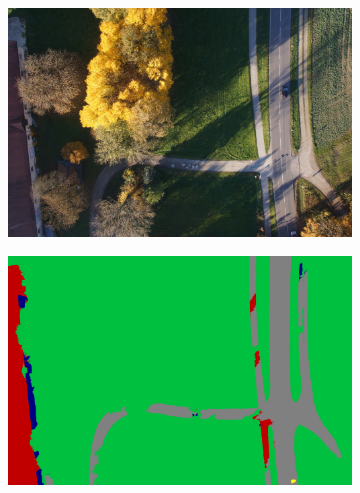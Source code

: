 \begin{figure}[htb]
\begin{subfigure}{0.32\columnwidth}
\end{subfigure}

\begin{subfigure}{0.32\columnwidth}
  \centering
  \includegraphics[width=1\linewidth]{fig/segmentation/DSC00991.JPG}

\end{subfigure}
\begin{subfigure}{0.32\columnwidth}
  \centering
  \includegraphics[width=1\linewidth]{fig/segmentation/DSC00991_manual.png}


\end{subfigure}
\end{figure}
